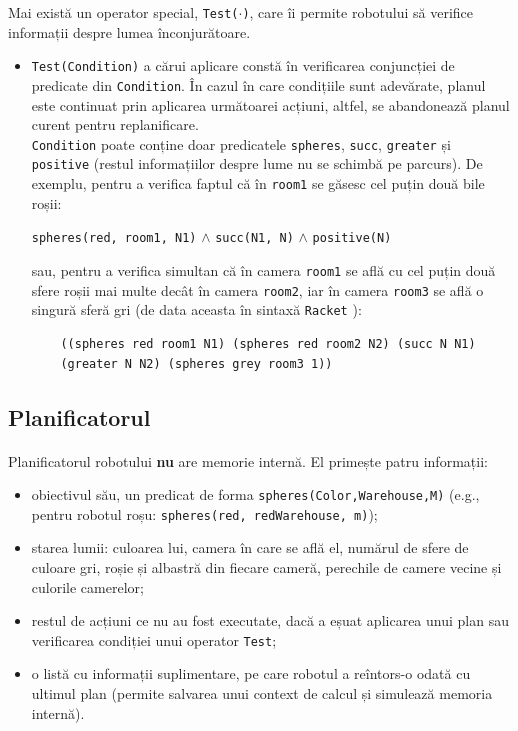\documentclass[12pt]{article}
\newcommand{\repr}[1]{{\color{sapphire}\texttt{#1}}}
\newcommand{\racket}[0]{{\color{burntorange}\texttt{Racket}} }
\begin{document}
Mai există un operator special, \repr{Test($\cdot$)}, care îi permite
robotului să verifice informații despre lumea înconjurătoare.

\begin{itemize}
\item \repr{Test(Condition)} a cărui aplicare constă în verificarea
  conjuncției de predicate din \repr{Condition}. În cazul în care
  condițiile sunt adevărate, planul este continuat prin aplicarea
  următoarei acțiuni, altfel, se abandonează planul curent pentru
  replanificare.\\
  \repr{Condition} poate conține doar predicatele \repr{spheres},
  \repr{succ}, \repr{greater} și \repr{positive} (restul informațiilor
  despre lume nu se schimbă pe parcurs). De exemplu, pentru a verifica
  faptul că în \repr{room1} se găsesc cel puțin două bile roșii:
  \begin{center}
    \repr{spheres(red, room1, N1)} $\wedge$ \repr{succ(N1, N)}
    $\wedge$ \repr{positive(N)}
  \end{center}
  sau, pentru a verifica simultan că în camera \repr{room1} se află cu
  cel puțin două sfere roșii mai multe decât în camera \repr{room2},
  iar în camera \repr{room3} se află o singură sferă gri (de data
  aceasta în sintaxă \racket):
  \begin{verbatim}
    ((spheres red room1 N1) (spheres red room2 N2) (succ N N1)
    (greater N N2) (spheres grey room3 1))
  \end{verbatim}
\end{itemize}

\subsection{Planificatorul}
\label{sec:planificator}

\paragraph{}

Planificatorul robotului \textbf{nu} are memorie internă. El primește
patru informații:
\begin{itemize}
\item obiectivul său, un predicat de forma
  \repr{spheres(Color,Warehouse,M)} (e.g., pentru robotul
  roșu: \repr{spheres(red, redWarehouse, m)});
\item starea lumii: culoarea lui, camera în care se află el, numărul
  de sfere de culoare gri, roșie și albastră din fiecare cameră,
  perechile de camere vecine și culorile camerelor;
\item restul de acțiuni ce nu au fost executate, dacă a eșuat
  aplicarea unui plan sau verificarea condiției unui operator
  \repr{Test};
\item o listă cu informații suplimentare, pe care robotul a reîntors-o
  odată cu ultimul plan (permite salvarea unui context de calcul și
  simulează memoria internă).
\end{itemize}
\end{document}
